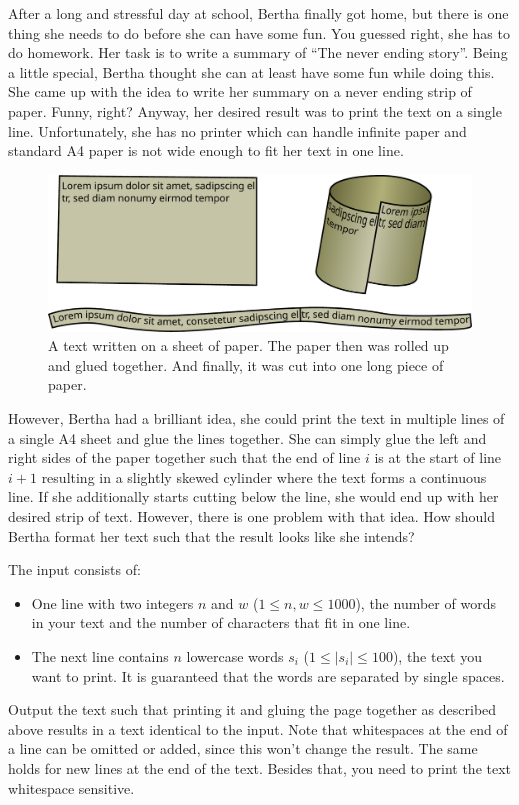 
After a long and stressful day at school, Bertha finally got home, but there is one thing she needs to do before she can have some fun.
You guessed right, she has to do homework.
Her task is to write a summary of ``The never ending story''.
Being a little special, Bertha thought she can at least have some fun while doing this.
She came up with the idea to write her summary on a never ending strip of paper. Funny, right?
Anyway, her desired result was to print the text on a single line.
Unfortunately, she has no printer which can handle infinite paper and standard A4 paper is not wide enough to fit her text in one line.

\begin{figure}[h]
	\centering
	\includegraphics[width=0.75\linewidth]{example}
	\caption{A text written on a sheet of paper.
		The paper then was rolled up and glued together.
		And finally, it was cut into one long piece of paper.}
\end{figure}

However, Bertha had a brilliant idea, she could print the text in multiple lines of a single A4 sheet and glue the lines together.
She can simply glue the left and right sides of the paper together such that the end of line $i$ is at the start of line $i+1$ resulting in a slightly skewed cylinder where the text forms a continuous line.
If she additionally starts cutting below the line, she would end up with her desired strip of text.
However, there is one problem with that idea.
How should Bertha format her text such that the result looks like she intends?

\begin{Input}
    The input consists of:
    \begin{itemize}
        \item One line with two integers $n$ and $w$ ($1\leq n,w\leq 1000$), the number of words in your text and the number of characters that fit in one line.
        \item The next line contains $n$ lowercase words $s_i$ ($1\leq |s_i|\leq100$), the text you want to print.
        It is guaranteed that the words are separated by single spaces.
    \end{itemize}
\end{Input}

\begin{Output}
	Output the text such that printing it and gluing the page together as
	described above results in a text identical to the input.
	Note that whitespaces at the end of a line can be omitted or added, since this won't change the result.
	The same holds for new lines at the end of the text.
	Besides that, you need to print the text whitespace sensitive.
\end{Output}
